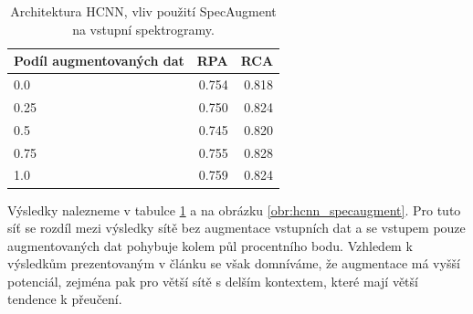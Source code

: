 \begin{table}[h]
\centering
    \begin{tabular}{lrr}
    \toprule
    Podíl augmentovaných dat &   RPA &   RCA \\
    \midrule
                        0.0 & 0.754 & 0.818 \\
                        0.25 & 0.750 & 0.824 \\
                        0.5 & 0.745 & 0.820 \\
                        0.75 & 0.755 & 0.828 \\
                        1.0 & 0.759 & 0.824 \\
    \bottomrule
    \end{tabular}
\caption{Architektura HCNN, vliv použití SpecAugment na vstupní spektrogramy.}\label{tab:hcnn_specaugment}
\end{table}


Výsledky nalezneme v tabulce \ref{tab:hcnn_specaugment} a na obrázku \ref{obr:hcnn_specaugment}. Pro tuto síť se rozdíl mezi výsledky sítě bez augmentace vstupních dat a se vstupem pouze augmentovaných dat pohybuje kolem půl procentního bodu. Vzhledem k výsledkům prezentovaným v článku \cite{Park2019} se však domníváme, že augmentace má vyšší potenciál, zejména pak pro větší sítě s delším kontextem, které mají větší tendence k přeučení.





